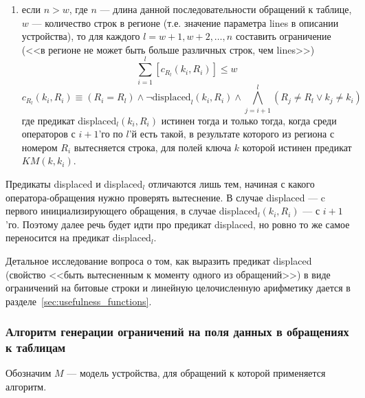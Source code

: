 \begin{enumerate}
    \item если $n > w$, где $n$ --- длина данной последовательности обращений к таблице, $w$ --- количество строк в регионе (т.е. значение параметра lines в описании устройства), то для каждого $l = w+1, w+2, \dots, n$ составить ограничение (<<в регионе не может быть больше различных строк, чем lines>>)
$$\sum_{i=1}^l [c_{R_l} (k_i, R_i)] \leqslant w$$
$$c_{R_l} (k_i, R_i) \equiv (R_i = R_l ) \wedge \neg \mbox{displaced}_l (k_i, R_i) \wedge \bigwedge_{j=i+1}^{l} (R_j \neq R_l \vee k_j \neq k_i)$$
где предикат displaced$_l (k_i, R_i)$ истинен тогда и только тогда, когда среди операторов с $i+1$'го по $l$'й есть такой, в результате которого из региона с номером $R_i$ вытесняется строка, для полей ключа $k$ которой истинен предикат $KM(k, k_i)$.
\end{enumerate}

Предикаты displaced и displaced$_l$ отличаются лишь тем, начиная с какого оператора-обращения нужно проверять вытеснение. В случае displaced --- c первого инициализирующего обращения, в случае displaced$_l(k_i, R_i)$ --- с $i+1$'го. Поэтому далее речь будет идти про предикат displaced, но ровно то же самое переносится на предикат displaced$_l$.

Детальное исследование вопроса о том, как выразить предикат displaced (свойство <<быть вытесненным к моменту одного из обращений>>) в виде ограничений на битовые строки и линейную целочисленную арифметику дается в разделе~\ref{sec:usefulness_functions}.

\subsubsection*{Алгоритм генерации ограничений на поля данных в обращениях к таблицам}

Обозначим $M$ --- модель устройства, для обращений к которой применяется алгоритм.

